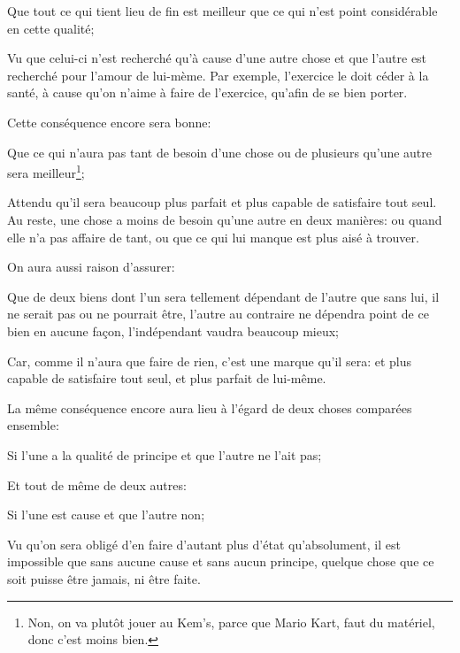 \begin{lieu}
	Que tout ce qui tient lieu de fin est meilleur que ce qui n'est point considérable en cette qualité;
\end{lieu}

Vu que celui-ci n'est recherché qu'à cause d'une autre chose et que l'autre est recherché pour l'amour de lui-mème. Par
exemple, l'exercice le doit céder à la santé, à cause qu'on n'aime à faire de l'exercice, qu'afin de se bien porter.

\bigbreak

Cette conséquence encore sera bonne:

\begin{lieu}
	Que ce qui n'aura pas tant de besoin d'une chose ou de plusieurs qu'une autre sera meilleur\footnote{Non, on va plutôt
	jouer au Kem's, parce que Mario Kart, faut du matériel, donc c'est moins bien.};
\end{lieu}

Attendu qu'il sera beaucoup plus parfait et plus capable de satisfaire tout seul. Au reste, une chose a moins de besoin
qu'une autre en deux manières: ou quand elle n'a pas affaire de tant, ou que ce qui lui manque est plus aisé à trouver.

\bigbreak

On aura aussi raison d'assurer:

\begin{lieu}
	Que de deux biens dont l'un sera tellement dépendant de l'autre que sans lui, il ne serait pas ou ne pourrait être,
	l'autre au contraire ne dépendra point de ce bien en aucune façon, l'indépendant vaudra beaucoup mieux;
\end{lieu}

Car, comme il n'aura que faire de rien, c'est une marque qu'il sera: et plus capable de satisfaire tout seul, et plus
parfait de lui-même.

La même conséquence encore aura lieu à l'égard de deux choses comparées ensemble:

\begin{lieu}
	Si l'une a la qualité de principe et que l'autre ne l'ait pas;
\end{lieu}

Et tout de même de deux autres:

\begin{lieu}
	Si l'une est cause et que l'autre non;
\end{lieu}

Vu qu'on sera obligé d'en faire d'autant plus d'état qu'absolument, il est impossible que sans aucune cause et sans aucun
principe, quelque chose que ce soit puisse être jamais, ni être faite.

